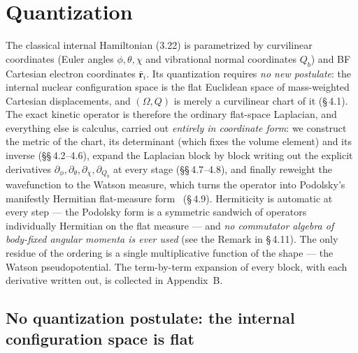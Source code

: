 \section{Quantization}

The classical internal Hamiltonian (3.22) is parametrized by curvilinear coordinates (Euler angles $\phi,\theta,\chi$ and vibrational normal coordinates $Q_b$) and BF Cartesian electron coordinates $\bar{\mathbf{r}}_i$. Its quantization requires \emph{no new postulate}: the internal nuclear configuration space is the flat Euclidean space of mass-weighted Cartesian displacements, and $(\Omega,Q)$ is merely a curvilinear chart of it (\S\,4.1). The exact kinetic operator is therefore the ordinary flat-space Laplacian, and everything else is calculus, carried out \emph{entirely in coordinate form}: we construct the metric of the chart, its determinant (which fixes the volume element) and its inverse (\S\S\,4.2--4.6), expand the Laplacian block by block writing out the explicit derivatives $\partial_\phi,\partial_\theta,\partial_\chi,\partial_{Q_b}$ at every stage (\S\S\,4.7--4.8), and finally reweight the wavefunction to the Watson measure, which turns the operator into Podolsky's manifestly Hermitian flat-measure form~\cite{podolsky1928} (\S\,4.9). Hermiticity is automatic at every step --- the Podolsky form is a symmetric sandwich of operators individually Hermitian on the flat measure --- and \emph{no commutator algebra of body-fixed angular momenta is ever used} (see the Remark in \S\,4.11). The only residue of the ordering is a single multiplicative function of the shape --- the Watson pseudopotential. The term-by-term expansion of every block, with each derivative written out, is collected in Appendix~B.

\subsection{No quantization postulate: the internal configuration space is flat}

